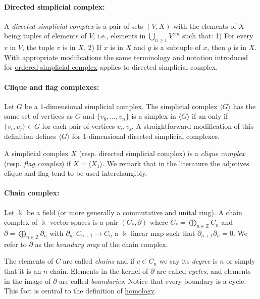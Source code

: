 \documentclass{article}
\begin{document}
	\paragraph{Directed simplicial complex:} A \textit{directed simplicial complex} is a pair of sets $(V, X)$ with the elements of $X$ being tuples of elements of $V$, i.e., elements in $\bigcup_{n\geq1} V^{\times n}$ such that: 1) For every $v$ in $V$, the tuple $v$ is in $X$. 2) If $x$ is in $X$ and $y$ is a subtuple of $x$, then $y$ is in $X$. With appropriate modifications the same terminology and notation introduced for \underline{ordered simplicial complex} applies to directed simplicial complex.
	
	\paragraph{Clique and flag complexes:} Let $G$ be a $1$-dimensional simplicial complex. The simplicial complex $\langle G \rangle$ has the same set of vertices as $G$ and $\{v_0, \dots, v_n\}$ is a simplex in $\langle G \rangle$ if an only if $\{v_i, v_j\} \in G$ for each pair of vertices $v_i, v_j$. A straightforward modification of this definition defines $\langle G \rangle$ for $1$-dimensional directed simplicial complexes. 
	
	A simplicial complex $X$ (resp. directed simplicial complex) is a \textit{clique complex} (resp. \textit{flag complex}) if $X = \langle X_1 \rangle$. We remark that in the literature the adjetives clique and flag tend to be used interchangibly.
	
	\paragraph{Chain complex:} Let $\Bbbk$ be a field (or more generally a commutative and unital ring). A chain complex of $\Bbbk$-vector spaces is a pair $(C_*, \partial)$ where $C_* = \bigoplus_{n \in \mathbb Z} C_n$ and $\partial = \bigoplus_{n \in \mathbb Z} \partial_n$ with  $\partial_n : C_{n+1} \to C_n$ a $\Bbbk$-linear map such that $\partial_{n+1} \partial_n = 0$. We refer to $\partial$ as the \textit{boundary map} of the chain complex.
	
	The elements of $C$ are called \textit{chains} and if $c \in C_n$ we say its \textit{degree} is $n$ or simply that it is an $n$-chain. Elements in the kernel of $\partial$ are called \textit{cycles}, and elements in the image of $\partial$ are called \textit{boundaries}. Notice that every boundary is a cycle. This fact is central to the definition of \underline{homology}.
	
\end{document}
